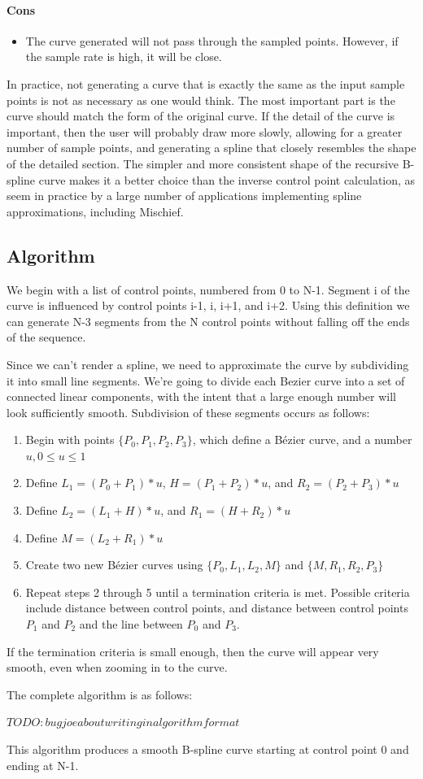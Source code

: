 \documentclass[12pt]{report}
\begin{document}
\paragraph{Cons}
\begin{itemize}
\item The curve generated will not pass through the sampled points. However, if the sample rate is high, it will be close.
\end{itemize}

In practice, not generating a curve that is exactly the same as the input sample points is not as necessary as one would think. 
The most important part is the curve should match the form of the original curve.
If the detail of the curve is important, then the user will probably draw more slowly, allowing for a greater number of sample points, and generating a spline that closely resembles the shape of the detailed section.
The simpler and more consistent shape of the recursive B-spline curve makes it a better choice than the inverse control point calculation, as seem in practice by a large number of applications implementing spline approximations, including Mischief.

\subsection{Algorithm}

We begin with a list of control points, numbered from 0 to N-1. 
Segment i of the curve is influenced by control points i-1, i, i+1, and i+2.
Using this definition we can generate N-3 segments from the N control points without falling off the ends of the sequence.

Since we can't render a spline, we need to approximate the curve by subdividing it into small line segments.
We're going to divide each Bezier curve into a set of connected linear components, with the intent that a large enough number will look sufficiently smooth.
Subdivision of these segments occurs as follows:
\begin{enumerate}
\item Begin with points $\{P_0,P_1,P_2,P_3\}$, which define a Bézier curve, and a number $u, 0 \le u \le 1$
\item Define $L_1=(P_0 + P_1)*u$, $H=(P_1 + P_2)*u$, and $R_2=(P_2 + P_3)*u$
\item Define $L_2=(L_1 + H)*u$, and $R_1=(H + R_2)*u$
\item Define $M=(L_2 + R_1)*u$
\item Create two new Bézier curves using $\{P_0,L_1,L_2,M\}$ and $\{M,R_1,R_2,P_3\}$
\item Repeat steps 2 through 5 until a termination criteria is met. Possible criteria include distance between control points, and distance between control points $P_1$ and $P_2$ and the line between $P_0$ and $P_3$.
\end{enumerate}
If the termination criteria is small enough, then the curve will appear very smooth, even when zooming in to the curve.

The complete algorithm is as follows:

$TODO: bug joe about writing in algorithm format$

This algorithm produces a smooth B-spline curve starting at control point 0 and ending at N-1.
\end{document}
